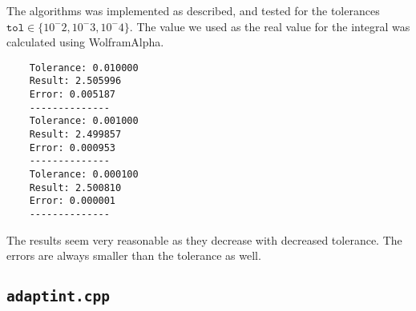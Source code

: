 \documentclass[12pt]{article}
\begin{document}
The algorithms was implemented as described, and tested for the tolerances $\texttt{tol} \in \{10^-2, 10^-3, 10^-4\}$. The value we used as the real value for the integral was calculated using WolframAlpha.
\begin{verbatim}
    Tolerance: 0.010000
    Result: 2.505996
    Error: 0.005187
    --------------
    Tolerance: 0.001000
    Result: 2.499857
    Error: 0.000953
    --------------
    Tolerance: 0.000100
    Result: 2.500810
    Error: 0.000001
    --------------
\end{verbatim}

The results seem very reasonable as they decrease with decreased tolerance. The errors are always smaller than the tolerance as well.

\subsection*{\texttt{adaptint.cpp}}

\end{document}
